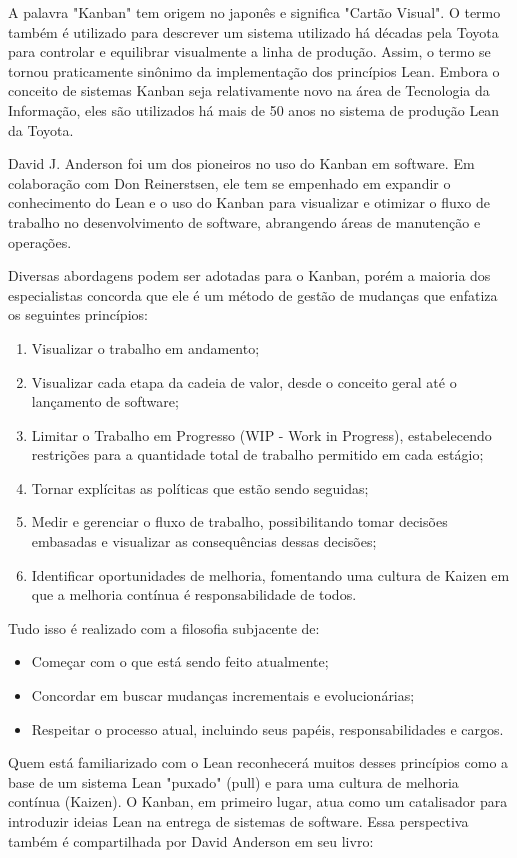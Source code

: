 A palavra "Kanban" tem origem no japonês e significa "Cartão Visual". O termo também é utilizado para descrever um sistema utilizado há décadas pela Toyota para controlar e equilibrar visualmente a linha de produção. Assim, o termo se tornou praticamente sinônimo da implementação dos princípios Lean. Embora o conceito de sistemas Kanban seja relativamente novo na área de Tecnologia da Informação, eles são utilizados há mais de 50 anos no sistema de produção Lean da Toyota.

David J. Anderson foi um dos pioneiros no uso do Kanban em software. Em colaboração com Don Reinerstsen, ele tem se empenhado em expandir o conhecimento do Lean e o uso do Kanban para visualizar e otimizar o fluxo de trabalho no desenvolvimento de software, abrangendo áreas de manutenção e operações.

Diversas abordagens podem ser adotadas para o Kanban, porém a maioria dos especialistas concorda que ele é um método de gestão de mudanças que enfatiza os seguintes princípios:

\begin{enumerate}
	\item Visualizar o trabalho em andamento;
	\item Visualizar cada etapa da cadeia de valor, desde o conceito geral até o lançamento de software;
	\item Limitar o Trabalho em Progresso (WIP - Work in Progress), estabelecendo restrições para a quantidade total de trabalho permitido em cada estágio;
	\item Tornar explícitas as políticas que estão sendo seguidas;
	\item Medir e gerenciar o fluxo de trabalho, possibilitando tomar decisões embasadas e visualizar as consequências dessas decisões;
	\item Identificar oportunidades de melhoria, fomentando uma cultura de Kaizen em que a melhoria contínua é responsabilidade de todos.
\end{enumerate}

Tudo isso é realizado com a filosofia subjacente de:

\begin{itemize}
	\item Começar com o que está sendo feito atualmente;
	\item Concordar em buscar mudanças incrementais e evolucionárias;
	\item Respeitar o processo atual, incluindo seus papéis, responsabilidades e cargos.
\end{itemize}

Quem está familiarizado com o Lean reconhecerá muitos desses princípios como a base de um sistema Lean "puxado" (pull) e para uma cultura de melhoria contínua (Kaizen). O Kanban, em primeiro lugar, atua como um catalisador para introduzir ideias Lean na entrega de sistemas de software. Essa perspectiva também é compartilhada por David Anderson em seu livro: